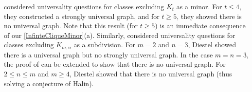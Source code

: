 \documentclass[a4paper,11pt]{article}
\theoremstyle{plain}
\theoremstyle{definition}
\renewcommand{\geq}{\geqslant}
\renewcommand{\leq}{\leqslant}
\begin{document}



\citet{DHV85} considered universality questions for classes excluding $K_t$ as a minor. For $t\leq 4$, they constructed a strongly universal graph, and for $t\geq 5$, they showed there is no universal graph. Note that this result (for $t\geq 5$) is an immediate consequence of our \cref{InfinteCliqueMinor}(a). Similarly, \citet{Diestel85} considered universality questions for classes excluding $K_{m,n}$ as a subdivision. For $m=2$ and $n=3$, Diestel showed there is a universal graph but no strongly universal graph. In the case $m=n=3$, the proof of \citet{Pach81a} can be extended to show that there is no universal graph. For $2\leq n\leq m$ and $m \geq 4$, Diestel showed that there is no universal graph (thus solving a conjecture of Halin). 
\end{document}
